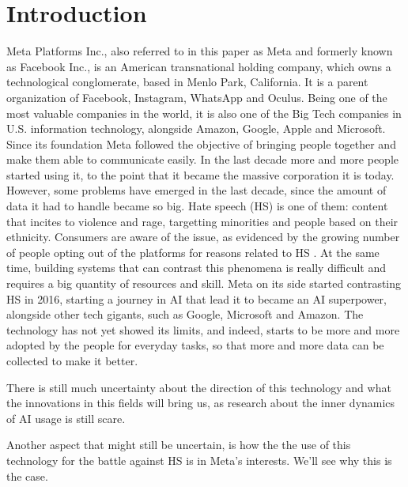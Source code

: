 \section{Introduction}

Meta Platforms Inc., also referred to in this paper as Meta and
formerly known as Facebook Inc., is an American transnational holding
company, which owns a technological conglomerate, based in Menlo Park,
California. It is a parent organization of Facebook, Instagram,
WhatsApp and Oculus. Being one of the most valuable companies in the
world, it is also one of the Big Tech companies in U.S. information
technology, alongside Amazon, Google, Apple and Microsoft. Since its
foundation Meta followed the objective of bringing people together and
make them able to communicate easily. In the last decade more and more
people started using it, to the point that it became the massive
corporation it is today. However, some problems have emerged in the
last decade, since the amount of data it had to handle became so
big. Hate speech (HS) is one of them: content that incites to violence
and rage, targetting minorities and people based on their
ethnicity. Consumers are aware of the issue, as evidenced by the
growing number of people opting out of the platforms for reasons
related to HS \cite{art:fortuna2018survey}. At the same time, building
systems that can contrast this phenomena is really difficult and
requires a big quantity of resources and skill. Meta on its side
started contrasting HS in 2016, starting a journey in AI that lead it
to became an AI superpower, alongside other tech gigants, such as
Google, Microsoft and Amazon. The technology has not yet showed its
limits, and indeed, starts to be more and more adopted by the people
for everyday tasks, so that more and more data can be collected to
make it better.

There is still much uncertainty about the direction of this technology
and what the innovations in this fields will bring us, as research
about the inner dynamics of AI usage is still scare.

Another aspect that might still be uncertain, is how the the use of
this technology for the battle against HS is in Meta's
interests. We'll see why this is the case.
